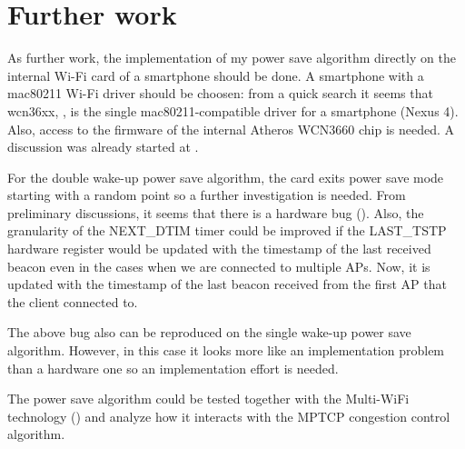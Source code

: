 \section{Further work}
\label{sec:furtherwork}

As further work, the implementation of my power save algorithm directly on the internal Wi-Fi card of a smartphone should be done. A smartphone with a mac80211 Wi-Fi driver should be choosen: from a quick search it seems that wcn36xx, \cite{cite-wcn}, is the single mac80211-compatible driver for a smartphone (Nexus 4). Also, access to the firmware of the internal Atheros WCN3660 chip is needed. A discussion was already started at \cite{cite-wcndiscussion}.

For the double wake-up power save algorithm, the card exits power save mode starting with a random point so a further investigation is needed. From preliminary discussions, it seems that there is a hardware bug (\cite{cite-bugps}). Also, the granularity of the NEXT_DTIM timer could be improved if the LAST_TSTP hardware register would be updated with the timestamp of the last received beacon even in the cases when we are connected to multiple APs. Now, it is updated with the timestamp of the last beacon received from the first AP that the client connected to.

The above bug also can be reproduced on the single wake-up power save algorithm. However, in this case it looks more like an implementation problem than a hardware one so an implementation effort is needed.

The power save algorithm could be tested together with the Multi-WiFi technology (\cite{cite-mwifi}) and analyze how it interacts with the MPTCP congestion control algorithm.


























